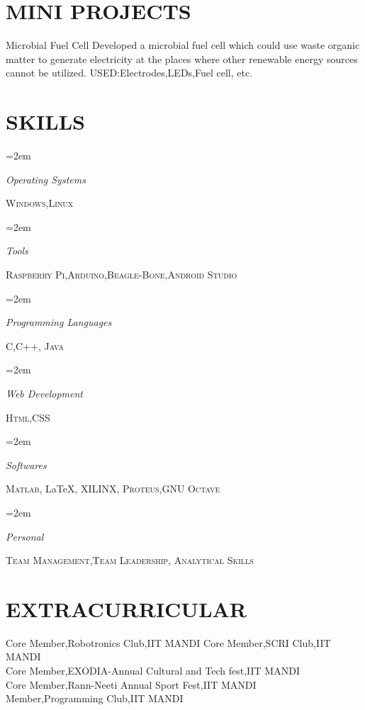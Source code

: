 \documentclass[paper=a4,fontsize=11pt]{scrartcl} %
\newlength{\spacebox}
\newcommand{\sepspace}{\vspace*{0.5em}}		%
\newcommand{\NewPart}[1]{\section*{\uppercase{#1}}}
\newcommand{\PersonalEntry}[2]{
		\noindent\hangindent=2em\hangafter=0 %
		\parbox{\spacebox}{        %
		\textit{#1}}		       %
		\hspace{1.5em} #2 \par}    %
\newcommand{\SkillsEntry}[2]{      %
		\noindent\hangindent=2em\hangafter=0 %
		\parbox{\spacebox}{        %
		\textit{#1}}			   %
		\hspace{1.5em} #2 \par}    %
\begin{document}
\NewPart{Mini Projects}
{Microbial Fuel Cell}\newline
{Developed a microbial fuel cell which could use waste organic matter to generate electricity at the places where other renewable energy sources cannot be utilized. }{USED:Electrodes,LEDs,Fuel cell, etc.}
\sepspace
\NewPart{Skills}{}

\SkillsEntry{Operating Systems}{\textsc{Windows},\textsc{Linux}}
\sepspace
\SkillsEntry{Tools}{\textsc{Raspberry Pi},\textsc{Arduino},\textsc{Beagle-Bone},\textsc{Android Studio}}
\sepspace
\SkillsEntry{Programming Languages}{\textsc{C},\textsc{C++}, \textsc{Java}}
\sepspace
\SkillsEntry{Web Development}{\textsc{Html},\textsc{CSS}}
\sepspace
\SkillsEntry{Softwares}{\textsc{Matlab}, \LaTeX, \textsc{XILINX}, \textsc{Proteus},\textsc{GNU Octave}}
\sepspace
\SkillsEntry{Personal}{\textsc{Team Management},\textsc{Team Leadership}, \textsc{Analytical Skills}}

\NewPart{Extracurricular}{}
Core Member,Robotronics Club,IIT MANDI\hfill \break
Core Member,SCRI Club,IIT MANDI\hfill \\
Core Member,EXODIA-Annual Cultural and Tech fest,IIT MANDI\hfill \\
Core Member,Rann-Neeti Annual Sport Fest,IIT MANDI\hfill \\
Member,Programming Club,IIT MANDI\hfill \break
\end{document}
